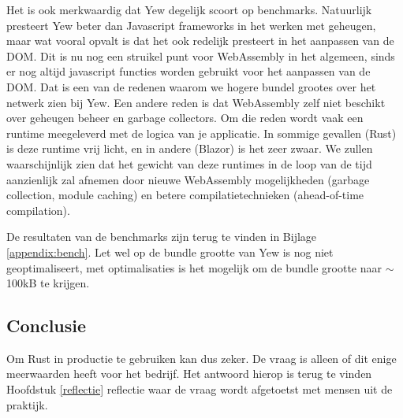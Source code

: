 Het is ook merkwaardig dat Yew degelijk scoort op benchmarks. Natuurlijk presteert Yew beter dan
Javascript frameworks in het werken met geheugen, maar wat vooral opvalt is dat het ook redelijk
presteert in het aanpassen van de DOM. Dit is nu nog een struikel punt voor WebAssembly in het
algemeen, sinds er nog altijd javascript functies worden gebruikt voor het aanpassen van de DOM.
Dat is een van de redenen waarom we hogere bundel grootes over het netwerk zien bij Yew.
Een andere reden is dat WebAssembly zelf niet beschikt over geheugen beheer en garbage collectors.
Om die reden wordt vaak een runtime meegeleverd met de logica van je applicatie. In sommige gevallen
(Rust) is deze runtime vrij licht, en in andere (Blazor) is het zeer zwaar. We zullen waarschijnlijk
zien dat het gewicht van deze runtimes in de loop van de tijd aanzienlijk zal afnemen door nieuwe
WebAssembly mogelijkheden (garbage collection, module caching) en betere compilatietechnieken
(ahead-of-time compilation).

De resultaten van de benchmarks zijn terug te vinden in Bijlage \ref{appendix:bench}. Let wel op de
bundle grootte van Yew is nog niet geoptimaliseert, met optimalisaties is het mogelijk om de bundle
grootte naar $\sim$100kB te krijgen.

\subsection{Conclusie}

Om Rust in productie te gebruiken kan dus zeker. De vraag is alleen of dit enige meerwaarden heeft
voor het bedrijf. Het antwoord hierop is terug te vinden Hoofdstuk \ref{reflectie} reflectie waar
de vraag wordt afgetoetst met mensen uit de praktijk.
